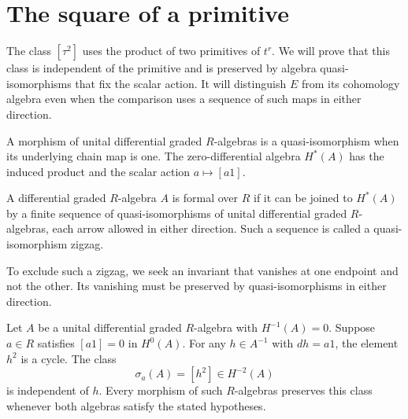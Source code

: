 \section{The square of a primitive}
\label{sec:rel-square-invariant}

The class $[\tau^2]$ uses the product of two primitives of $t^r$.
We will prove that this class is independent of the primitive and is
preserved by algebra quasi-isomorphisms that fix the scalar action.
It will distinguish $E$ from its cohomology algebra even when the
comparison uses a sequence of such maps in either direction.

A morphism of unital differential graded $R$-algebras is a
quasi-isomorphism when its underlying chain map is one.
The zero-differential algebra $H^*(A)$ has the induced product and
the scalar action $a\mapsto[a1]$.

\begin{definition}\label{def:rel-formality}
A differential graded $R$-algebra $A$ is formal over $R$ if it can be
joined to $H^*(A)$ by a finite sequence of quasi-isomorphisms of unital
differential graded $R$-algebras, each arrow allowed in either direction.
Such a sequence is called a quasi-isomorphism zigzag.
\end{definition}

To exclude such a zigzag, we seek an invariant that vanishes at one
endpoint and not the other. Its vanishing must be preserved by
quasi-isomorphisms in either direction.

\begin{lemma}\label{lem:rel-square-invariant}
Let $A$ be a unital differential graded $R$-algebra with $H^{-1}(A)=0$.
Suppose $a\in R$ satisfies $[a1]=0$ in $H^0(A)$.
For any $h\in A^{-1}$ with $dh=a1$, the element $h^2$ is a cycle.
The class
\[
 \sigma_a(A)=[h^2]\in H^{-2}(A)
\]
is independent of $h$.
Every morphism of such $R$-algebras preserves this class whenever both
algebras satisfy the stated hypotheses.
\end{lemma}

